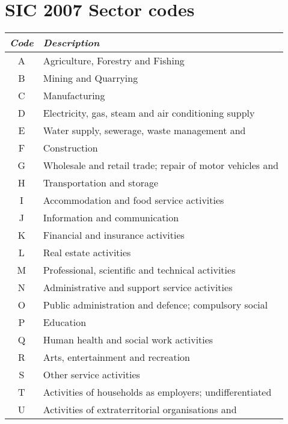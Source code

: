 \section{SIC 2007 Sector codes}
\label{app:sector_codes}
    \begin{centering}
    \scriptsize{
    \label{tab:sector-codes}
    \begin{tabular}{|c|l|}\hline 
    \emph{Code} & \emph{Description} \\ \hline 
A & Agriculture, Forestry and Fishing \\
B & Mining and Quarrying \\
C & Manufacturing \\
D & Electricity, gas, steam and air conditioning supply \\
E & Water supply, sewerage, waste management and \\
F & Construction \\
G & Wholesale and retail trade; repair of motor vehicles and \\
H & Transportation and storage \\
I & Accommodation and food service activities \\
J & Information and communication \\
K & Financial and insurance activities \\
L & Real estate activities \\
M & Professional, scientific and technical activities \\
N & Administrative and support service activities \\
O & Public administration and defence; compulsory social \\
P & Education \\
Q & Human health and social work activities \\
R & Arts, entertainment and recreation \\
S & Other service activities \\
T & Activities of households as employers; undifferentiated \\
U & Activities of extraterritorial organisations and \\
\hline
    \end{tabular} 
    }

\end{centering}